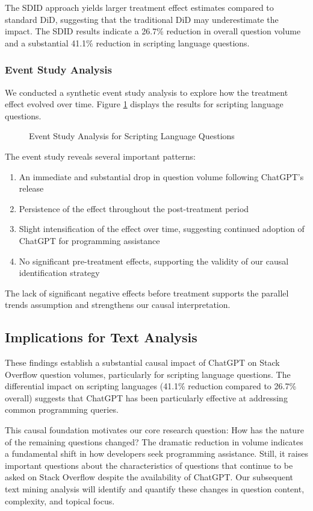 The SDID approach yields larger treatment effect estimates compared to standard DiD, suggesting that the traditional DiD may underestimate the impact. The SDID results indicate a 26.7\% reduction in overall question volume and a substantial 41.1\% reduction in scripting language questions.

\subsubsection{Event Study Analysis}
We conducted a synthetic event study analysis to explore how the treatment effect evolved over time. Figure \ref{fig:event_study} displays the results for scripting language questions.

\begin{figure}[htpb!]
    \centering
    
    \caption{Event Study Analysis for Scripting Language Questions}
    \label{fig:event_study}
\end{figure}

The event study reveals several important patterns:

\begin{enumerate}
    \item An immediate and substantial drop in question volume following ChatGPT's release
    \item Persistence of the effect throughout the post-treatment period
    \item Slight intensification of the effect over time, suggesting continued adoption of ChatGPT for programming assistance
    \item No significant pre-treatment effects, supporting the validity of our causal identification strategy
\end{enumerate}

The lack of significant negative effects before treatment supports the parallel trends assumption and strengthens our causal interpretation.

\subsection{Implications for Text Analysis}

These findings establish a substantial causal impact of ChatGPT on Stack Overflow question volumes, particularly for scripting language questions. The differential impact on scripting languages (41.1\% reduction compared to 26.7\% overall) suggests that ChatGPT has been particularly effective at addressing common programming queries.

This causal foundation motivates our core research question: How has the nature of the remaining questions changed? The dramatic reduction in volume indicates a fundamental shift in how developers seek programming assistance. Still, it raises important questions about the characteristics of questions that continue to be asked on Stack Overflow despite the availability of ChatGPT. Our subsequent text mining analysis will identify and quantify these changes in question content, complexity, and topical focus.
